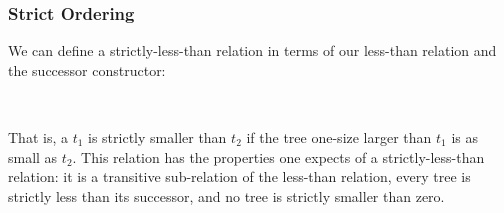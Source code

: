 \subsubsection{Strict Ordering}

We can define a strictly-less-than relation in terms of our less-than relation
and the successor constructor:
\begin{code}%
%
\>[4]\AgdaOperator{\AgdaFunction{\AgdaUnderscore{}<\AgdaUnderscore{}}}\AgdaSpace{}%
\AgdaSymbol{:}\AgdaSpace{}%
\AgdaSpace{}%
\AgdaSpace{}%
\AgdaSpace{}%
\AgdaSpace{}%
\AgdaSpace{}%
\<%
\\
%
\>[4]\AgdaSpace{}%
\AgdaOperator{\AgdaFunction{<}}\AgdaSpace{}%
\AgdaSpace{}%
\AgdaSymbol{=}\AgdaSpace{}%
\AgdaSpace{}%
\AgdaSpace{}%
\AgdaSpace{}%
\<%
\end{code}

  That is, a $t_{1}$ is strictly smaller than $t_{2}$ if the tree one-size larger than $t_{1}$ is as small as $t_{2}$.
  This relation has the properties one expects of a strictly-less-than
  relation: it is a transitive  sub-relation of the less-than relation,
  every tree is strictly less than its successor,
  and no tree is strictly smaller than zero.

